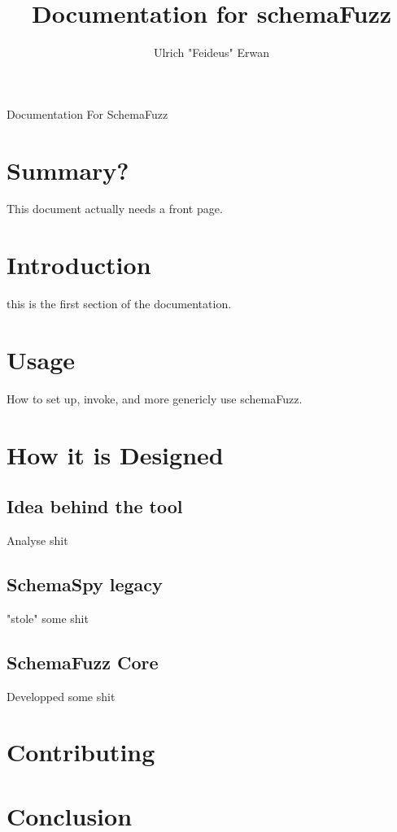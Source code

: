 \documentclass{article}
\title{Documentation for schemaFuzz}
\author{Ulrich "Feideus" Erwan}
\begin{document}
	
\maketitle Documentation For SchemaFuzz
	\section{Summary?}
		This document actually needs a front page.
	\section{Introduction}
		this is the first section of the documentation.
	\section{Usage}
		How to set up, invoke, and more genericly use schemaFuzz.
	\section{How it is Designed}
		\subsection{Idea behind the tool}
			Analyse shit
		\subsection{SchemaSpy legacy}
			"stole" some shit
		\subsection{SchemaFuzz Core}
			Developped some shit
	
	\section{Contributing}
	\section{Conclusion}
\end{document}
